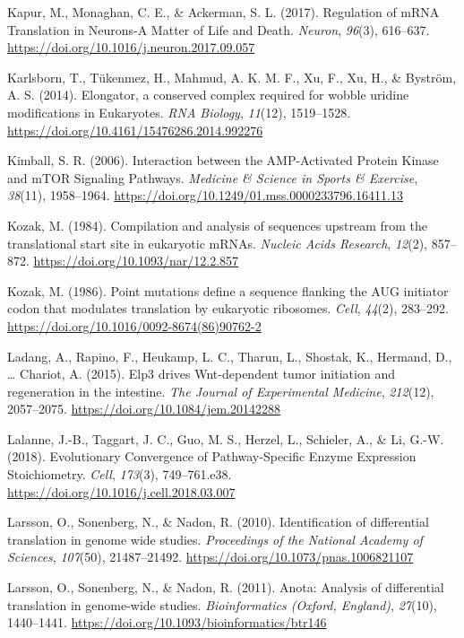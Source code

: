 \documentclass[12pt,openany]{book}
\begin{document}
\hypertarget{ref-Kapur2017}{}
Kapur, M., Monaghan, C. E., \& Ackerman, S. L. (2017). Regulation of
mRNA Translation in Neurons-A Matter of Life and Death. \emph{Neuron},
\emph{96}(3), 616--637.
\url{https://doi.org/10.1016/j.neuron.2017.09.057}

\hypertarget{ref-Karlsborn2014}{}
Karlsborn, T., Tükenmez, H., Mahmud, A. K. M. F., Xu, F., Xu, H., \&
Byström, A. S. (2014). Elongator, a conserved complex required for
wobble uridine modifications in Eukaryotes. \emph{RNA Biology},
\emph{11}(12), 1519--1528.
\url{https://doi.org/10.4161/15476286.2014.992276}

\hypertarget{ref-Kimball2006}{}
Kimball, S. R. (2006). Interaction between the AMP-Activated Protein
Kinase and mTOR Signaling Pathways. \emph{Medicine \& Science in Sports
\& Exercise}, \emph{38}(11), 1958--1964.
\url{https://doi.org/10.1249/01.mss.0000233796.16411.13}

\hypertarget{ref-Kozak1984}{}
Kozak, M. (1984). Compilation and analysis of sequences upstream from
the translational start site in eukaryotic mRNAs. \emph{Nucleic Acids
Research}, \emph{12}(2), 857--872.
\url{https://doi.org/10.1093/nar/12.2.857}

\hypertarget{ref-Kozak1986}{}
Kozak, M. (1986). Point mutations define a sequence flanking the AUG
initiator codon that modulates translation by eukaryotic ribosomes.
\emph{Cell}, \emph{44}(2), 283--292.
\url{https://doi.org/10.1016/0092-8674(86)90762-2}

\hypertarget{ref-Ladang2015}{}
Ladang, A., Rapino, F., Heukamp, L. C., Tharun, L., Shostak, K.,
Hermand, D., \ldots{} Chariot, A. (2015). Elp3 drives Wnt-dependent
tumor initiation and regeneration in the intestine. \emph{The Journal of
Experimental Medicine}, \emph{212}(12), 2057--2075.
\url{https://doi.org/10.1084/jem.20142288}

\hypertarget{ref-Lalanne2018}{}
Lalanne, J.-B., Taggart, J. C., Guo, M. S., Herzel, L., Schieler, A., \&
Li, G.-W. (2018). Evolutionary Convergence of Pathway-Specific Enzyme
Expression Stoichiometry. \emph{Cell}, \emph{173}(3), 749--761.e38.
\url{https://doi.org/10.1016/j.cell.2018.03.007}

\hypertarget{ref-Larsson2010}{}
Larsson, O., Sonenberg, N., \& Nadon, R. (2010). Identification of
differential translation in genome wide studies. \emph{Proceedings of
the National Academy of Sciences}, \emph{107}(50), 21487--21492.
\url{https://doi.org/10.1073/pnas.1006821107}

\hypertarget{ref-Larsson2011}{}
Larsson, O., Sonenberg, N., \& Nadon, R. (2011). Anota: Analysis of
differential translation in genome-wide studies. \emph{Bioinformatics
(Oxford, England)}, \emph{27}(10), 1440--1441.
\url{https://doi.org/10.1093/bioinformatics/btr146}
\end{document}
